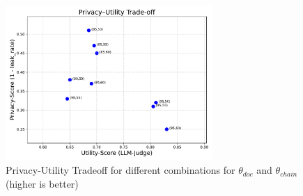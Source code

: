 \begin{figure}[h]
    \centering
    \includegraphics[width=0.7\textwidth]{figures/c3_privacy_utility_tradeoff.pdf}
    \caption{Privacy-Utility Tradeoff for different combinations for  $\theta_{doc}$ and $\theta_{chain}$ (higher is better)}
    \label{approach-fig:privacy_utility_thetas}
\end{figure}





